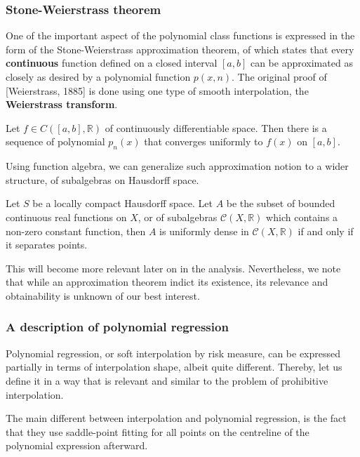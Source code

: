 \subsubsection{Stone-Weierstrass theorem}

One of the important aspect of the polynomial class functions is expressed in the form of the Stone-Weierstrass approximation theorem, of which states that every \textbf{continuous} function defined on a closed interval $[a,b]$ can be approximated as closely as desired by a polynomial function $p(x,n)$. The original proof of [Weierstrass, 1885] is done using one type of smooth interpolation, the \textbf{Weierstrass transform}. 

\begin{theorem}
    Let $f\in C([a,b],\mathbb{R})$ of continuously differentiable space. Then there is a sequence of polynomial $p_n (x)$ that converges uniformly to $f(x)$ on $[a,b]$.     
\end{theorem}

Using function algebra, we can generalize such approximation notion to a wider structure, of subalgebras on Hausdorff space. 

\begin{theorem}
  Let $S$ be a locally compact Hausdorff space. Let $A$ be the subset of bounded continuous real functions on $X$, or of subalgebras $\mathcal{C}(X,\mathbb{R})$ which contains a non-zero constant function, then $A$ is uniformly dense in $\mathcal{C}(X,\mathbb{R})$ if and only if it separates points. 
\end{theorem}

This will become more relevant later on in the analysis. Nevertheless, we note that while an approximation theorem indict its existence, its relevance and obtainability is unknown of our best interest. 

\subsubsection{A description of polynomial regression}

Polynomial regression, or soft interpolation by risk measure, can be expressed partially in terms of interpolation shape, albeit quite different. Thereby, let us define it in a way that is relevant and similar to the problem of prohibitive interpolation. 

The main different between interpolation and polynomial regression, is the fact that they use saddle-point fitting for all points on the centreline of the polynomial expression afterward. 

